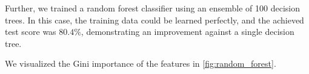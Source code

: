 Further, we trained a random forest classifier using an ensemble of 100 decision trees. In this case, the training data could be learned perfectly, and the achieved test score was $80.4\%$, demonstrating an improvement against a single decision tree.

We visualized the Gini importance of the features in \autoref{fig:random_forest}.

